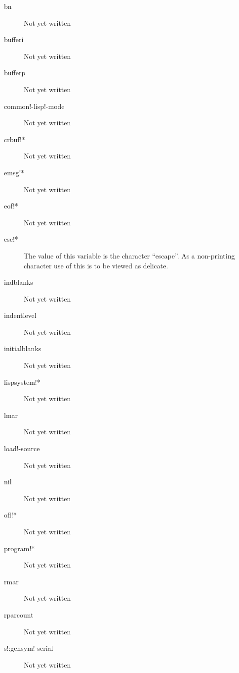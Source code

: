 \documentclass[a4paper,11pt]{article}
\begin{document}
\begin{description}
\item [{\ttfamily bn}]
Not yet written

\item [{\ttfamily bufferi}]
Not yet written

\item [{\ttfamily bufferp}]
Not yet written

\item [{\ttfamily common!-lisp!-mode}]
Not yet written

\item [{\ttfamily crbuf!*}]
Not yet written

\item [{\ttfamily emsg!*}]
Not yet written

\item [{\ttfamily eof!*}]
Not yet written

\item [{\ttfamily esc!*}]
The value of this variable is the character ``escape''. As a non-printing
character use of this is to be viewed as delicate.

\item [{\ttfamily indblanks}]
Not yet written

\item [{\ttfamily indentlevel}]
Not yet written

\item [{\ttfamily initialblanks}]
Not yet written

\item [{\ttfamily lispsystem!*}]
Not yet written

\item [{\ttfamily lmar}]
Not yet written

\item [{\ttfamily load!-source}]
Not yet written

\item [{\ttfamily nil}]
Not yet written

\item [{\ttfamily ofl!*}]
Not yet written

\item [{\ttfamily program!*}]
Not yet written

\item [{\ttfamily rmar}]
Not yet written

\item [{\ttfamily rparcount}]
Not yet written

\item [{\ttfamily s!:gensym!-serial}]
Not yet written


\end{description}
\end{document}
